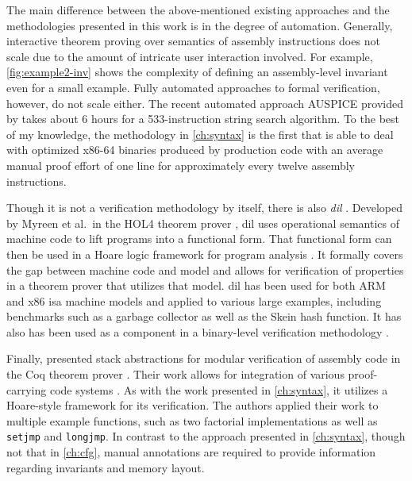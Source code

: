 The main difference between the above-mentioned existing approaches
and the methodologies presented in this work is in the degree of automation.
Generally, interactive theorem proving over semantics of assembly instructions
does not scale due to the amount of intricate user interaction involved.
For example, \cref{fig:example2-inv} shows
the complexity of defining an assembly-level invariant even for a small example.
Fully automated approaches to formal verification, however, do not scale either.
The recent automated approach AUSPICE provided by \textcite{tan2015auspice}
takes about 6 hours for a 533-instruction string search algorithm.
To the best of my knowledge,
the methodology in \cref{ch:syntax} is the first that is able to deal with
optimized x86-64 binaries produced by production code
with an average manual proof effort of one line
for approximately every twelve assembly instructions.

Though it is not a verification methodology by itself,
there is also \emph{\ac{dil}} \autocite{myreen2008decompilation,myreen2012decompilation}.
Developed by Myreen et al.\ in the HOL4 theorem prover \autocite{slind2008brief},
\ac{dil} uses operational semantics of machine code
to lift programs into a functional form.
That functional form can then be used in a Hoare logic framework
for program analysis \autocite{myreen2007hoare}.
It formally covers the gap between machine code and  model
and allows for verification of properties in a theorem prover that utilizes that model.
\Ac{dil} has been used for both ARM and x86 \ac{isa} machine models
and applied to various large examples,
including benchmarks such as a garbage collector as well as the Skein hash function.
It has also has been used as a component in a binary-level verification methodology \autocite{sewell2013tvv}.

Finally, \textcite{feng2006modular,feng2005sbca} presented stack abstractions
for modular verification of assembly code
in the Coq theorem prover \autocite{chlipala2013certified}.
Their work allows for integration
of various proof-carrying code systems \autocite{necula1997proof}.
As with the work presented in \cref{ch:syntax},
it utilizes a Hoare-style framework for its verification.
The authors applied their work to multiple example functions,
such as two factorial implementations
as well as \lstinline[style=C]|setjmp| and \lstinline[style=C]|longjmp|.
In contrast to the approach presented in \cref{ch:syntax},
though not that in \cref{ch:cfg},
manual annotations are required to provide information
regarding invariants and memory layout.

